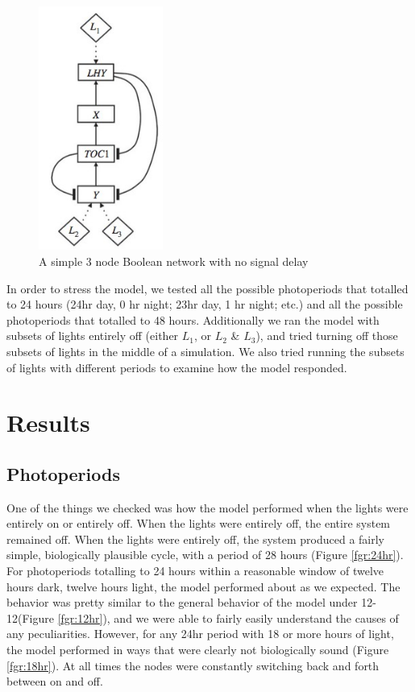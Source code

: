 \documentclass[twoside,twocolumn,9pt]{article}
\begin{document}
\begin{figure}[h]
\centering
  \includegraphics[height=8cm]{network}
  \caption{A simple 3 node Boolean network with no signal delay}
  \label{fgr:network}
\end{figure}

In order to stress the model, we tested all the possible photoperiods that totalled to 24 hours (24hr day, 0 hr night; 23hr day, 1 hr night; etc.) and all the possible photoperiods that totalled to 48 hours. Additionally we ran the model with subsets of lights entirely off (either $L_1$, or $L_2$ \& $L_3$), and tried turning off those subsets of lights in the middle of a simulation. We also tried running the subsets of lights with different periods to examine how the model responded.

\section{Results}

\subsection{Photoperiods}
One of the things we checked was how the model performed when the lights were entirely on or entirely off. When the lights were entirely off, the entire system remained off. When the lights were entirely off, the system produced a fairly simple, biologically plausible cycle, with a period of 28 hours (Figure \ref{fgr:24hr}). \\
For photoperiods totalling to 24 hours within a reasonable window of twelve hours dark, twelve hours light, the model performed about as we expected. The behavior was pretty similar to the general behavior of the model under 12-12(Figure \ref{fgr:12hr}), and we were able to fairly easily understand the causes of any peculiarities. However, for any 24hr period with 18 or more hours of light, the model performed in ways that were clearly not biologically sound (Figure \ref{fgr:18hr}). At all times the nodes were constantly switching back and forth between on and off.\\
\end{document}
